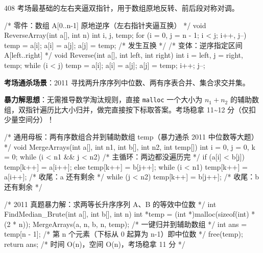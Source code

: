 \documentclass[10pt,a4paper]{ctexart}
\begin{document}

408 考场最基础的左右夹逼双指针，用于数组原地反转、前后段对称对调。

\begin{codebox}
/* 零件：数组 A[0..n-1] 原地逆序（左右指针夹逼互换） */
void ReverseArray(int a[], int n) {
    int i, j, temp;
    for (i = 0, j = n - 1; i < j; i++, j--) {
        temp = a[i]; a[i] = a[j]; a[j] = temp;   /* 发生互换 */
    }
}
/* 变体：逆序指定区间 A[left..right] */
void Reverse(int a[], int left, int right) {
    int i = left, j = right, temp;
    while (i < j) {
        temp = a[i]; a[i] = a[j]; a[j] = temp;
        i++; j--;
    }
}
\end{codebox}

\par\addvspace{3pt}\par\addvspace{3pt}


\textbf{考场通杀场景}：2011 寻找两升序序列中位数、两有序表合并、集合求交并集。

\textbf{暴力解思想}：无需推导数学淘汰规则，直接 \texttt{malloc} 一个大小为 $n_1 + n_2$ 的辅助数组，双指针遍历比大小归并，做完直接按下标取答案。考场稳拿 11\textasciitilde{}12 分（仅扣少量空间分）！

\begin{codebox}
/* 通用母板：两有序数组合并到辅助数组 temp（暴力通杀 2011 中位数等大题） */
void MergeArrays(int a[], int n1, int b[], int n2, int temp[]) {
    int i = 0, j = 0, k = 0;
    while (i < n1 && j < n2) {          /* 主循环：两边都没遍历完 */
        if (a[i] < b[j]) temp[k++] = a[i++];
        else temp[k++] = b[j++];
    }
    while (i < n1) temp[k++] = a[i++];  /* 收尾：a 还有剩余 */
    while (j < n2) temp[k++] = b[j++];  /* 收尾：b 还有剩余 */
}

/* 2011 真题暴力解：求两等长升序序列 A、B 的等效中位数 */
int FindMedian_Brute(int a[], int b[], int n) {
    int *temp = (int *)malloc(sizeof(int) * (2 * n));
    MergeArrays(a, n, b, n, temp);      /* 一键归并到辅助数组 */
    int ans = temp[n - 1];              /* 第 n 个元素（下标从 0 起算为 n-1）即中位数 */
    free(temp);
    return ans;                         /* 时间 O(n)，空间 O(n)，考场稳拿 11 分 */
}
\end{codebox}
\end{document}
